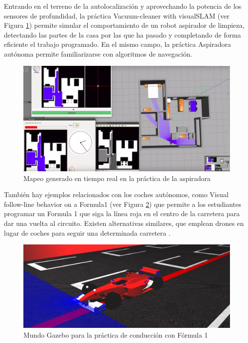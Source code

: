 \documentclass[12pt,spanish,chapterprefix, numbers=noenddot]{book}
\numberwithin{equation}{section}
\numberwithin{figure}{section}
\begin{document}
Entrando en el terreno de la autolocalización y aprovechando la potencia de los sensores de profundidad, la práctica Vacuum-cleaner with visualSLAM (ver Figura \ref{fig:vacuum}) permite simular el comportamiento de un robot aspirador de limpieza, detectando las partes de la casa por las que ha pasado y completando de forma eficiente el trabajo programado. En el mismo campo, la práctica Aspiradora autónoma \cite{Vanessa} permite familiarizarse con algoritmos de navegación. 

\begin{figure}[hbt!]
\centering
\includegraphics[width=12cm]{Figs/vacuumcleaner.png}
\par
\caption{\label{fig:vacuum}Mapeo generado en tiempo real en la práctica de la aspiradora}
\end{figure}

También hay ejemplos relacionados con los coches autónomos, como Visual follow-line behavior on a Formula1 (ver Figura \ref{fig:f1}) que permite a los estudiantes programar un Formula 1 que siga la línea roja en el centro de la carretera para dar una vuelta al circuito. Existen alternativas similares, que emplean drones en lugar de coches para seguir una determinada carretera \cite{Pablo}.

\begin{figure}[hbt!]
\centering
\includegraphics[width=12cm]{Figs/f1.png}
\par
\caption{\label{fig:f1}Mundo Gazebo para la práctica de conducción con Fórmula 1}
\end{figure}
\end{document}
